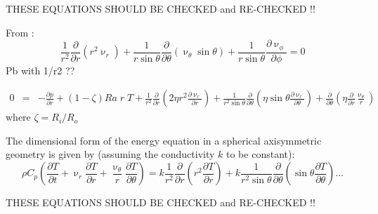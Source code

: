 THESE EQUATIONS SHOULD BE CHECKED and RE-CHECKED !!



From \cite{zebi93}:
\begin{equation}
\frac{1}{r^2} \frac{\partial}{\partial r} (r^2 \upnu_r) + 
\frac{1}{r \sin \theta} \frac{\partial}{\partial \theta} (\upnu_\theta \sin \theta)+
\frac{1}{r \sin \theta} \frac{\partial \upnu_\phi}{\partial \phi} = 0
\end{equation}
Pb with 1/r2 ??

\begin{eqnarray}
0 &=& -\frac{\partial p}{\partial r} + (1-\zeta) Ra \; r \; T + 
\frac{1}{r^2}\frac{\partial}{\partial r} \left( 2 \eta r^2 \frac{\partial \upnu_r}{\partial r} \right)
+ \frac{1}{r^2 \sin\theta} \frac{\partial}{\partial\theta} 
\left( \eta \sin\theta \frac{\partial \upnu_r}{\partial\theta} \right)
+\frac{\partial}{\partial \theta} \left(\eta \frac{\partial}{\partial r} \frac{\upnu_\theta}{r} \right)
\end{eqnarray}
where $\zeta=R_i/R_o$


The dimensional form of the energy equation in a spherical axisymmetric geometry is given by
(assuming the conductivity $k$ to be constant):
\[
\rho C_p \left( \frac{\partial T}{\partial t}  + 
\upnu_r \frac{\partial T}{\partial r} + \frac{\upnu_\theta}{r} \frac{\partial T}{\partial \theta}
\right)
=
k \frac{1}{r^2} \frac{\partial}{\partial r} \left( r^2 \frac{\partial T}{\partial r} \right)
+
k \frac{1}{r^2 \sin\theta} 
\frac{\partial}{\partial \theta} \left( \sin\theta \frac{\partial T}{\partial \theta}  \right) 
...
\]

THESE EQUATIONS SHOULD BE CHECKED and RE-CHECKED !!




